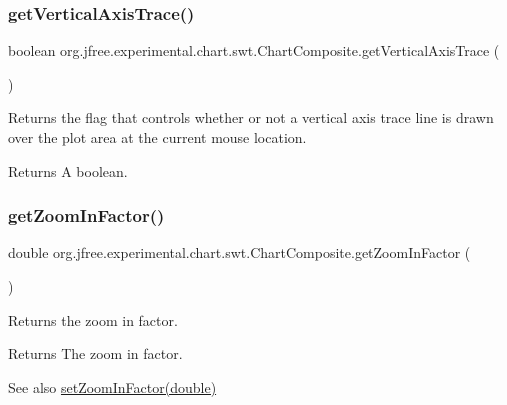 \subsubsection{\texorpdfstring{get\+Vertical\+Axis\+Trace()}{getVerticalAxisTrace()}}
{\footnotesize\ttfamily boolean org.\+jfree.\+experimental.\+chart.\+swt.\+Chart\+Composite.\+get\+Vertical\+Axis\+Trace (\begin{DoxyParamCaption}{ }\end{DoxyParamCaption})}

Returns the flag that controls whether or not a vertical axis trace line is drawn over the plot area at the current mouse location.

\begin{DoxyReturn}{Returns}
A boolean. 
\end{DoxyReturn}
\mbox{\label{classorg_1_1jfree_1_1experimental_1_1chart_1_1swt_1_1_chart_composite_a3cbdc5dd4939115b7ab7460273a5b43e}} 
\subsubsection{\texorpdfstring{get\+Zoom\+In\+Factor()}{getZoomInFactor()}}
{\footnotesize\ttfamily double org.\+jfree.\+experimental.\+chart.\+swt.\+Chart\+Composite.\+get\+Zoom\+In\+Factor (\begin{DoxyParamCaption}{ }\end{DoxyParamCaption})}

Returns the zoom in factor.

\begin{DoxyReturn}{Returns}
The zoom in factor.
\end{DoxyReturn}
\begin{DoxySeeAlso}{See also}
\mbox{\hyperlink{classorg_1_1jfree_1_1experimental_1_1chart_1_1swt_1_1_chart_composite_a6d67355c31636983a53bb8df72042def}{set\+Zoom\+In\+Factor(double)}} 
\end{DoxySeeAlso}
\mbox{\label{classorg_1_1jfree_1_1experimental_1_1chart_1_1swt_1_1_chart_composite_acfca8f3fd361b336c10d53ace3bc6251}} 

